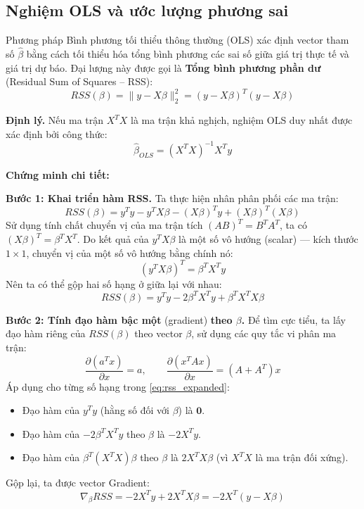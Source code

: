 \documentclass[a4paper]{article}
\begin{document}
\subsection{Nghiệm OLS và ước lượng phương sai}

Phương pháp Bình phương tối thiểu thông thường (OLS) xác định vector tham số $\hat{\beta}$ bằng cách tối thiểu hóa tổng bình phương các sai số giữa giá trị thực tế và giá trị dự báo. Đại lượng này được gọi là \textbf{Tổng bình phương phần dư} (Residual Sum of Squares -- RSS):
\begin{equation}
RSS(\beta) = \lVert y - X\beta \rVert_2^2 = (y - X\beta)^T(y - X\beta)
\end{equation}

\textbf{Định lý.} Nếu ma trận $X^TX$ là ma trận khả nghịch, nghiệm OLS duy nhất được xác định bởi công thức:
\begin{equation}
\hat{\beta}_{OLS} = (X^TX)^{-1}X^Ty
\end{equation}

\textbf{Chứng minh chi tiết:}

\textbf{Bước 1: Khai triển hàm RSS.}
Ta thực hiện nhân phân phối các ma trận:
$$RSS(\beta) = y^Ty - y^TX\beta - (X\beta)^Ty + (X\beta)^T(X\beta)$$
Sử dụng tính chất chuyển vị của ma trận tích $(AB)^T = B^TA^T$, ta có $(X\beta)^T = \beta^TX^T$. Do kết quả của $y^TX\beta$ là một số vô hướng (scalar) --- kích thước $1 \times 1$, chuyển vị của một số vô hướng bằng chính nó:
$$(y^TX\beta)^T = \beta^TX^Ty$$
Nên ta có thể gộp hai số hạng ở giữa lại với nhau:
\begin{equation}\label{eq:rss_expanded}
RSS(\beta) = y^Ty - 2\beta^TX^Ty + \beta^TX^TX\beta
\end{equation}

\textbf{Bước 2: Tính đạo hàm bậc một} (gradient) \textbf{theo $\beta$.}
Để tìm cực tiểu, ta lấy đạo hàm riêng của $RSS(\beta)$ theo vector $\beta$, sử dụng các quy tắc vi phân ma trận:
$$\frac{\partial (a^Tx)}{\partial x} = a, \qquad \frac{\partial (x^TAx)}{\partial x} = (A + A^T)x$$
Áp dụng cho từng số hạng trong \eqref{eq:rss_expanded}:
\begin{itemize}
    \item Đạo hàm của $y^Ty$ (hằng số đối với $\beta$) là $\mathbf{0}$.
    \item Đạo hàm của $-2\beta^TX^Ty$ theo $\beta$ là $-2X^Ty$.
    \item Đạo hàm của $\beta^T(X^TX)\beta$ theo $\beta$ là $2X^TX\beta$ (vì $X^TX$ là ma trận đối xứng).
\end{itemize}
Gộp lại, ta được vector Gradient:
\begin{equation}\label{eq:gradient_rss}
\nabla_{\beta}RSS = -2X^Ty + 2X^TX\beta = -2X^T(y - X\beta)
\end{equation}
\end{document}
